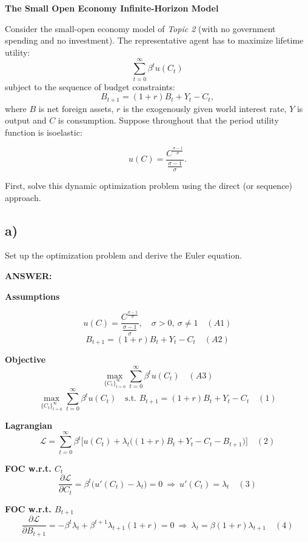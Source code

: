 \documentclass[12pt]{article}
\begin{document}
\textbf{The Small Open Economy Infinite-Horizon Model}

\noindent
Consider the small-open economy model of \textit{Topic 2} (with no government spending and no investment). The representative agent has to maximize lifetime utility:
\[
\sum_{t=0}^{\infty} \beta^t u(C_t)
\]
subject to the sequence of budget constraints:
\[
B_{t+1} = (1 + r)B_t + Y_t - C_t,
\]
where $B$ is net foreign assets, $r$ is the exogenously given world interest rate, $Y$ is output and $C$ is consumption. Suppose throughout that the period utility function is isoelastic:

\[
u(C) = \frac{C^{\frac{\sigma - 1}{\sigma}}}{\frac{\sigma - 1}{\sigma}}.
\]


\vspace{1em}

First, solve this dynamic optimization problem using the direct (or sequence) approach.

\subsection*{\noindent\textbf{a)}}

Set up the optimization problem and derive the Euler equation.

\vspace{0.5em}
\noindent\textcolor{formalred}{\textbf{ANSWER:}}

\textbf{Assumptions}

\[
u(C)=\frac{C^{\tfrac{\sigma-1}{\sigma}}}{\tfrac{\sigma-1}{\sigma}},\quad \sigma>0,\ \sigma\neq 1
\quad (A1)
\]
\[
B_{t+1}=(1+r)B_t+Y_t-C_t 
\quad (A2)
\]

\textbf{Objective}
\[
\max_{\{C_t\}_{t=0}^{\infty}} \sum_{t=0}^{\infty} \beta^t u(C_t)
\quad (A3)
\]
\[
\max_{\{C_t\}_{t=0}^{\infty}} \sum_{t=0}^{\infty} \beta^t u(C_t)
\quad \text{s.t. } B_{t+1}=(1+r)B_t+Y_t-C_t
\quad (1)
\]

\textbf{Lagrangian}
\[
\mathcal{L}=\sum_{t=0}^{\infty}\beta^t 
\Big[u(C_t)+\lambda_t\big((1+r)B_t+Y_t-C_t-B_{t+1}\big)\Big]
\quad (2)
\]

\textbf{FOC w.r.t. \(C_t\)}
\[
\frac{\partial \mathcal{L}}{\partial C_t}
=\beta^t\big(u'(C_t)-\lambda_t\big)=0
\ \Rightarrow\ 
u'(C_t)=\lambda_t
\quad (3)
\]

\textbf{FOC w.r.t. \(B_{t+1}\)}
\[
\frac{\partial \mathcal{L}}{\partial B_{t+1}}
=-\beta^t\lambda_t+\beta^{t+1}\lambda_{t+1}(1+r)=0
\ \Rightarrow\ 
\lambda_t=\beta(1+r)\lambda_{t+1}
\quad (4)
\]
\end{document}
